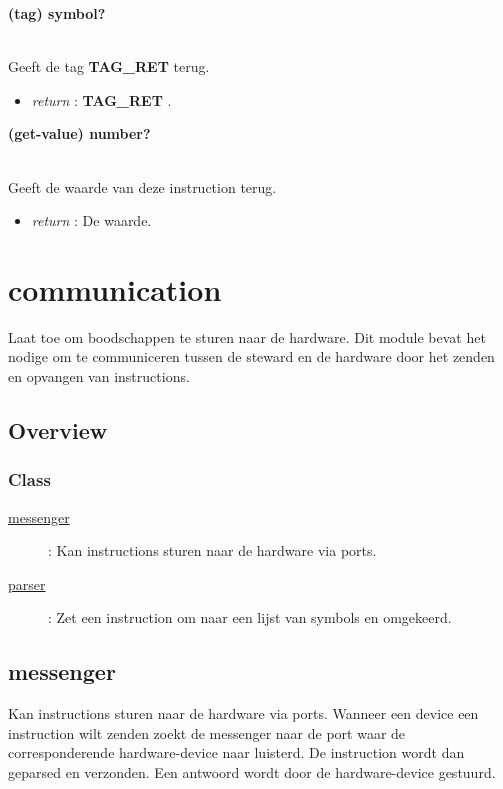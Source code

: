 \documentclass{article}
\newcommand{\ar}{\ding{213} }
\newcommand{\code}[1]{\textcolor{code}{#1}}
\newcommand{\lb}[1][]{\code{(#1}}
\newcommand{\rb}{\code{)}}
\newcommand{\racket}[1]{
	{\color{blue}\textbf{#1}}
}
\begin{document}
\begin{framed}
	\hypertarget{instruction-ret:tag}{\racket{\lb[tag]\rb \ar \code{symbol?}}}
	\\Geeft de tag \racket{TAG\_RET} terug.
	\begin{itemize}
		\item \emph{return} : \racket{TAG\_RET}.
	\end{itemize}
\end{framed}

\begin{framed}
	\hypertarget{instruction-ret:get-value}{\racket{\lb[get-value]\rb \ar \code{number?}}}
	\\Geeft de waarde van deze instruction terug.
	\begin{itemize}
		\item \emph{return} : De waarde.
	\end{itemize}
\end{framed}

\newpage
\hypertarget{communication}{\section{communication}}
Laat toe om boodschappen te sturen naar de hardware. Dit module bevat het nodige om te communiceren tussen de steward en de hardware door het zenden en opvangen van instructions.

\subsection{Overview}

\subsubsection{Class}
	\begin{description}
		\item[\hyperlink{messenger}{messenger}] : Kan instructions sturen naar de hardware via ports.
		\item[\hyperlink{parser}{parser}] : Zet een instruction om naar een lijst van symbols en omgekeerd.
	\end{description}
	
	\newpage
	\hypertarget{messenger}{\subsection{messenger}}
	Kan instructions sturen naar de hardware via ports. Wanneer een device een instruction wilt zenden zoekt de messenger naar de port waar de corresponderende hardware-device naar luisterd. De instruction wordt dan geparsed en verzonden. Een antwoord wordt door de hardware-device gestuurd.
\end{document}
